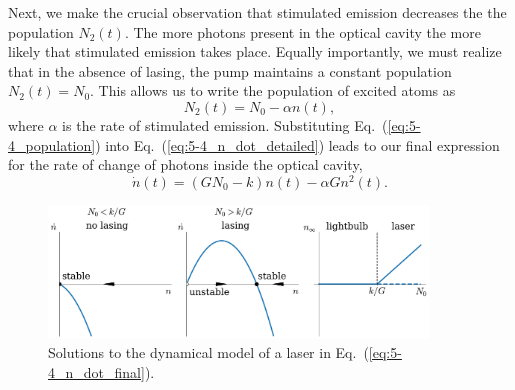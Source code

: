Next, we make the crucial observation that stimulated emission decreases the the population $N_2(t)$.
The more photons present in the optical cavity the more likely that stimulated emission takes place.
Equally importantly, we must realize that in the absence of lasing, the pump maintains a constant population $N_2(t) = N_0$.
This allows us to write the population of excited atoms as
\begin{equation}
    N_2(t) = N_0 - \alpha n(t),
    \label{eq:5-4_population}
\end{equation}
where $\alpha$ is the rate of stimulated emission.
Substituting Eq.~(\ref{eq:5-4_population}) into Eq.~(\ref{eq:5-4_n_dot_detailed}) leads to our final expression for the rate of change of photons inside the optical cavity,
\begin{equation}
    \dot{n}(t) = (G N_0 - k) n(t) - \alpha G n^2(t).
    \label{eq:5-4_n_dot_final}
\end{equation}

\begin{figure}
    \centering
    \includegraphics[width=0.9\textwidth]{lesson5/5-4_lasing.pdf}
    \caption[Dynamical model of a laser]{Solutions to the dynamical model of a laser in Eq.~(\ref{eq:5-4_n_dot_final}).}
    \label{fig:5-4_lasing}
\end{figure}

